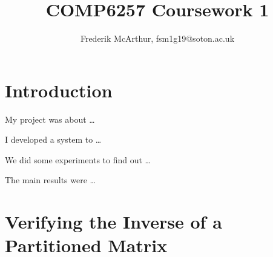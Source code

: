 \documentclass[a4paper, 11pt]{article}
\title{COMP6257 Coursework 1}
\author{Frederik McArthur, fsm1g19@soton.ac.uk}
\begin{document}
\maketitle
\tableofcontents

\section{Introduction}
\label{section:partitionedmatrix}

My project was about \ldots

I developed a system to \ldots

We did some experiments to find out \ldots

The main results were \ldots

\pagebreak

\section{Verifying the Inverse of a Partitioned Matrix}
\end{document}
